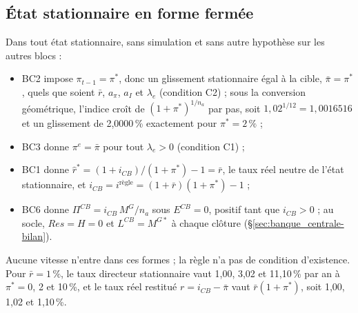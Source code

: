 \documentclass[11pt,a4paper]{article}
\begin{document}
\subsection{État stationnaire en forme fermée}
\label{sec:banque_centrale-stationnaire}
\begin{proposee}
Dans tout état stationnaire, sans simulation et sans autre hypothèse sur les autres blocs :
\begin{itemize}
\item BC2 impose $\pi_{t-1} = \pi^\ast$, donc un glissement stationnaire égal à la cible, $\bar\pi = \pi^\ast$, quels que soient $\bar r$, $a_\pi$, $a_I$ et $\lambda_e$ (condition C2) ; sous la conversion géométrique, l'indice croît de $(1 + \pi^\ast)^{1/n_a}$ par pas, soit $1{,}02^{1/12} = 1{,}0016516$ et un glissement de 2,0000\,\% exactement pour $\pi^\ast = 2\,\%$ ;
\item BC3 donne $\pi^e = \bar\pi$ pour tout $\lambda_e > 0$ (condition C1) ;
\item BC1 donne $\hat r^\ast = (1 + i_{\mathit{CB}})/(1 + \pi^\ast) - 1 = \bar r$, le taux réel neutre de l'état stationnaire, et $i_{\mathit{CB}} = i^{\text{règle}} = (1 + \bar r)(1 + \pi^\ast) - 1$ ;
\item BC6 donne $\Pi^{\mathit{CB}} = i_{\mathit{CB}}\,M^G/n_a$ sous $E^{\mathit{CB}} = 0$, positif tant que $i_{\mathit{CB}} > 0$ ; au socle, $\mathit{Res} = H = 0$ et $L^{\mathit{CB}} = M^{G*}$ à chaque clôture (\S\ref{sec:banque_centrale-bilan}).
\end{itemize}
Aucune vitesse n'entre dans ces formes ; la règle n'a pas de condition d'existence. Pour $\bar r = 1\,\%$, le taux directeur stationnaire vaut 1,00, 3,02 et 11,10\,\% par an à $\pi^\ast = 0$, 2 et 10\,\%, et le taux réel restitué $r = i_{\mathit{CB}} - \bar\pi$ vaut $\bar r(1 + \pi^\ast)$, soit 1,00, 1,02 et 1,10\,\%.


\end{proposee}
\end{document}
